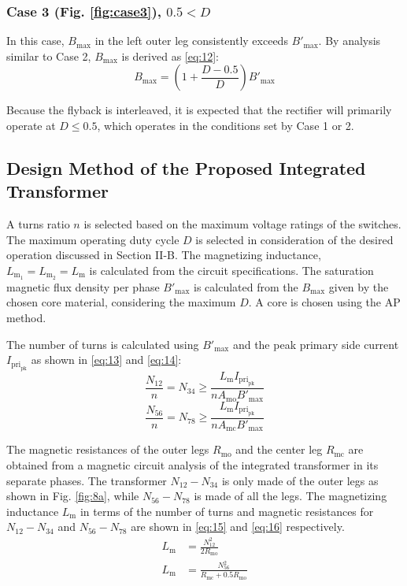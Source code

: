 \documentclass[lettersize,journal]{IEEEtran}
\begin{document}
\subsubsection*{\textup{Case 3 (Fig. \ref{fig:case3}), $0.5 < D$}}
In this case, $B_{\mathrm{max}}$ in the left outer leg consistently exceeds $B'_{\mathrm{max}}$. By analysis similar to Case 2, $B_{\mathrm{max}}$ is derived as \eqref{eq:12}:
\begin{equation}
\label{eq:12}
B_{\mathrm{max}} = \left(1 + \frac{D - 0.5}{D}\right) B'_{\mathrm{max}}
\end{equation}

Because the flyback is interleaved, it is expected that the rectifier will primarily operate at $D \le 0.5$, which operates in the conditions set by Case 1 or 2.

\subsection{Design Method of the Proposed Integrated Transformer}
A turns ratio $n$ is selected based on the maximum voltage ratings of the switches. The maximum operating duty cycle $D$ is selected in consideration of the desired operation discussed in Section II-B. The magnetizing inductance, $L_{\mathrm{m}_1}=L_{\mathrm{m}_2}=L_{\mathrm{m}}$ is calculated from the circuit specifications. The saturation magnetic flux density per phase $B'_{\mathrm{max}}$ is calculated from the $B_{\mathrm{max}}$ given by the chosen core material, considering the maximum $D$. A core is chosen using the AP method. 

The number of turns is calculated using $B'_{\mathrm{max}}$ and the peak primary side current $I_{\mathrm{pri}_{\mathrm{pk}}}$ as shown in \eqref{eq:13} and \eqref{eq:14}:
\begin{equation}
\label{eq:13}
\frac{N_{12}}{n} = N_{34} \ge \frac{L_{\mathrm{m}} I_{\mathrm{pri}_{\mathrm{pk}}}}{n A_{\mathrm{mo}} B'_{\mathrm{max}}}
\end{equation}
\begin{equation}
\label{eq:14}
\frac{N_{56}}{n} = N_{78} \ge \frac{L_{\mathrm{m}} I_{\mathrm{pri}_{\mathrm{pk}}}}{n A_{\mathrm{mc}} B'_{\mathrm{max}}}
\end{equation}

The magnetic resistances of the outer legs $R_{\mathrm{mo}}$ and the center leg $R_{\mathrm{mc}}$ are obtained from a magnetic circuit analysis of the integrated transformer in its separate phases. The transformer $N_{12}-N_{34}$ is only made of the outer legs as shown in Fig. \ref{fig:8a}, while $N_{56}-N_{78}$ is made of all the legs. The magnetizing inductance $L_{\mathrm{m}}$ in terms of the number of turns and magnetic resistances for $N_{12}-N_{34}$ and $N_{56}-N_{78}$ are shown in \eqref{eq:15} and \eqref{eq:16} respectively.
\begin{align}
L_{\mathrm{m}} &= \frac{N_{12}^2}{2 R_{\mathrm{mo}}} \label{eq:15}\\
L_{\mathrm{m}} &= \frac{N_{56}^2}{R_{\mathrm{mc}} + 0.5 R_{\mathrm{mo}}} \label{eq:16}
\end{align}
\end{document}
